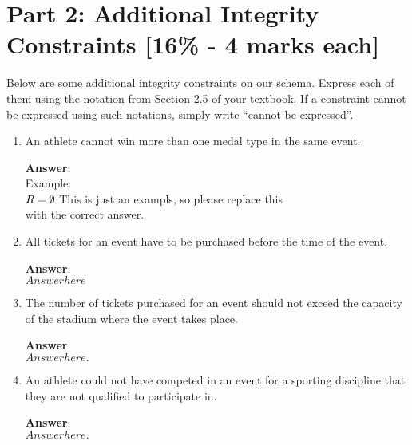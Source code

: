 \documentclass{article}
\begin{document}
\section*{Part 2: Additional Integrity Constraints [16\% - 4 marks each]}

Below are some additional integrity constraints on our schema. Express each of them 
using the notation from Section 2.5 of your textbook. If a constraint cannot be 
expressed using such notations, simply write ``cannot be expressed''.


\begin{enumerate}

\item   %
An athlete cannot win more than one medal type in the same event.

{\bf Answer}:\\[5pt]
{
Example:\\[5pt]
$
R = \emptyset\\[5pt]
$
This is just an exampls, so please replace this \\[5pt]
with the correct answer.
}

\item   %
All tickets for an event have to be purchased before the time of the event.

{\bf Answer}:\\[5pt]
{
$
Answer here
$
}


\item   %
The number of tickets purchased for an event should not exceed the capacity 
of the stadium where the event takes place.

{\bf Answer}:\\[5pt]
{
$
Answer here.
$
}

\item   %
An athlete could not have competed in an event for a sporting discipline 
that they are not qualified to participate in.

{\bf Answer}:\\[5pt]
{
$
Answer here.
$
}

\end{enumerate}
  
\end{document}
